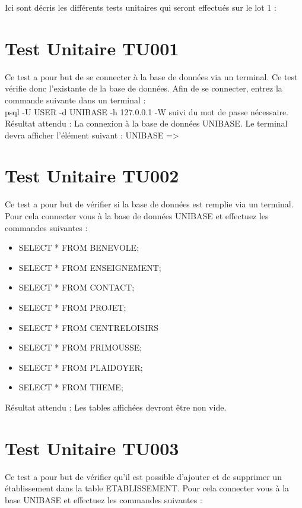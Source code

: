 Ici sont décris les différents tests unitaires qui seront effectués sur le lot 1 :

\section{Test Unitaire TU001}
	Ce test a pour but de se connecter à la base de données via un terminal. Ce test vérifie donc l'existante de la base de données. Afin de se connecter, entrez la commande suivante dans un terminal :\\
	
	 psql -U USER -d UNIBASE -h 127.0.0.1 -W suivi du mot de passe nécessaire. \\
	
	Résultat attendu : La connexion à la base de données UNIBASE. Le terminal devra afficher l'élément suivant : UNIBASE =>

\section{Test Unitaire TU002}
	Ce test a pour but de vérifier si la base de données est remplie via un terminal. Pour cela connecter vous à la base de données UNIBASE et effectuez les commandes suivantes : \\
	
	\begin{itemize}
		\item SELECT * FROM BENEVOLE;
		\item SELECT * FROM ENSEIGNEMENT;
		\item SELECT * FROM CONTACT; 
		\item SELECT * FROM PROJET;
		\item SELECT * FROM CENTRELOISIRS
		\item SELECT * FROM FRIMOUSSE;
		\item SELECT * FROM PLAIDOYER;
		\item SELECT * FROM THEME;
	\end{itemize} 
	
	Résultat attendu : Les tables affichées devront être non vide.	
	
\section{Test Unitaire TU003}
	Ce test a pour but de vérifier qu'il est possible d'ajouter et de supprimer un établissement dans la table ETABLISSEMENT. Pour cela connecter vous à la base UNIBASE et effectuez les commandes suivantes : \\
	
